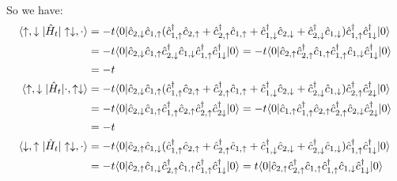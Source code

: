 \documentclass[12pt]{article}
\begin{document}
\\
So we have:
\begin{align}
\langle\uparrow,\downarrow|\hat{H}_t|\uparrow\downarrow,\cdot\rangle&=-t\langle0|\hat{c}_{2,\downarrow}\hat{c}_{1,\uparrow}(\hat{c}_{1,\uparrow}^\dagger \hat{c}_{2,\uparrow}+\hat{c}_{2,\uparrow}^\dagger \hat{c}_{1,\uparrow}+\hat{c}_{1,\downarrow}^\dagger \hat{c}_{2,\downarrow}+\hat{c}_{2,\downarrow}^\dagger \hat{c}_{1,\downarrow})\hat{c}_{1,\uparrow}^\dagger\hat{c}_{1\downarrow}^\dagger|0\rangle\\
&=-t\langle0|\hat{c}_{2,\downarrow}\hat{c}_{1,\uparrow}\hat{c}_{2,\downarrow}^\dagger \hat{c}_{1,\downarrow}\hat{c}_{1,\uparrow}^\dagger\hat{c}_{1\downarrow}^\dagger|0\rangle=-t\langle0|\hat{c}_{2,\uparrow}\hat{c}_{2,\uparrow}^\dagger \hat{c}_{1,\uparrow}\hat{c}_{1,\uparrow}^\dagger\hat{c}_{1,\downarrow}\hat{c}_{1\downarrow}^\dagger|0\rangle\notag\\
&=-t\notag\\
\langle\uparrow,\downarrow|\hat{H}_t|\cdot,\uparrow\downarrow\rangle&=-t\langle0|\hat{c}_{2,\downarrow}\hat{c}_{1,\uparrow}(\hat{c}_{1,\uparrow}^\dagger \hat{c}_{2,\uparrow}+\hat{c}_{2,\uparrow}^\dagger \hat{c}_{1,\uparrow}+\hat{c}_{1,\downarrow}^\dagger \hat{c}_{2,\downarrow}+\hat{c}_{2,\downarrow}^\dagger \hat{c}_{1,\downarrow})\hat{c}_{2,\uparrow}^\dagger\hat{c}_{2\downarrow}^\dagger|0\rangle\\
&=-t\langle0|\hat{c}_{2,\downarrow}\hat{c}_{1,\uparrow}\hat{c}_{1,\uparrow}^\dagger \hat{c}_{2,\uparrow}\hat{c}_{2,\uparrow}^\dagger\hat{c}_{2\downarrow}^\dagger|0\rangle=-t\langle0|\hat{c}_{1,\uparrow}\hat{c}_{1,\uparrow}^\dagger \hat{c}_{2,\uparrow}\hat{c}_{2,\uparrow}^\dagger\hat{c}_{2,\downarrow}\hat{c}_{2\downarrow}^\dagger|0\rangle\notag\\
&=-t\notag\\
\langle\downarrow,\uparrow|\hat{H}_t|\uparrow\downarrow,\cdot\rangle&=-t\langle0|\hat{c}_{2,\uparrow}\hat{c}_{1,\downarrow}(\hat{c}_{1,\uparrow}^\dagger \hat{c}_{2,\uparrow}+\hat{c}_{2,\uparrow}^\dagger \hat{c}_{1,\uparrow}+\hat{c}_{1,\downarrow}^\dagger \hat{c}_{2,\downarrow}+\hat{c}_{2,\downarrow}^\dagger \hat{c}_{1,\downarrow})\hat{c}_{1,\uparrow}^\dagger\hat{c}_{1\downarrow}^\dagger|0\rangle\\
&=-t\langle0|\hat{c}_{2,\uparrow}\hat{c}_{1,\downarrow}\hat{c}_{2,\uparrow}^\dagger \hat{c}_{1,\uparrow}\hat{c}_{1,\uparrow}^\dagger\hat{c}_{1\downarrow}^\dagger|0\rangle=t\langle0|\hat{c}_{2,\uparrow}\hat{c}_{2,\uparrow}^\dagger \hat{c}_{1,\uparrow}\hat{c}_{1,\uparrow}^\dagger\hat{c}_{1,\downarrow}\hat{c}_{1\downarrow}^\dagger|0\rangle\notag\\

\end{align}
\end{document}
